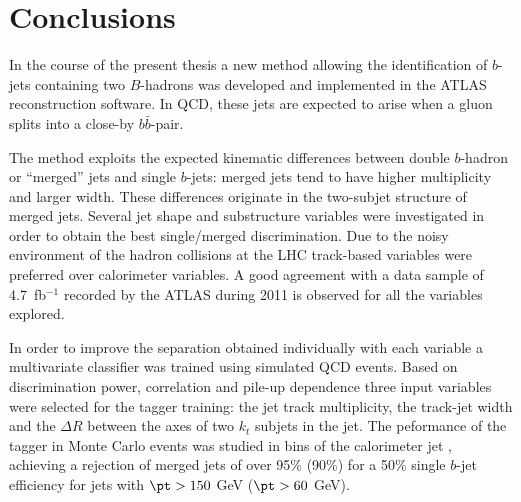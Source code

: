 %
%
\chapter{Conclusions}\label{ch:conclusions}

In the course of the present thesis a new method allowing the identification of $b$-jets containing two $B$-hadrons was developed and implemented in the ATLAS reconstruction software. In QCD, these jets are expected to arise when a gluon splits into a close-by $b\bar{b}$-pair. 


The method exploits the expected kinematic differences between double $b$-hadron or ``merged'' jets and single $b$-jets: merged jets tend to have higher multiplicity and larger width.  These differences originate in the two-subjet structure of merged jets.  Several jet shape and substructure variables were investigated in order to obtain the best single/merged discrimination.  Due to the noisy environment of the hadron collisions at the LHC track-based variables were preferred over calorimeter variables.   A good agreement with a data sample of 4.7~fb$^{-1}$ recorded by the ATLAS during 2011 is observed for all the variables explored.

In order to improve the separation obtained individually with each variable a multivariate classifier was trained using simulated QCD events. Based on discrimination power, correlation and pile-up dependence three input variables were selected for the tagger training: the jet track multiplicity, the track-jet width and the $\Delta R$ between the axes of two $k_t$ subjets in the jet. 
 The peformance of the tagger in Monte Carlo events was studied in bins of the calorimeter jet \pt, achieving a rejection of merged jets of over 95\% (90\%) for a 50\% single $b$-jet efficiency for jets with $\pt>150$ GeV ($\pt>60$ GeV).




